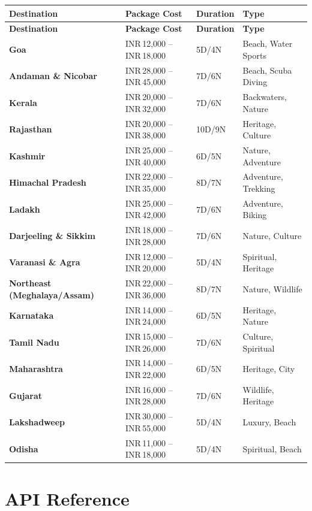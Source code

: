 \documentclass[12pt,a4paper]{article}
\newcommand{\rupee}{INR\,}
\begin{document}
\begin{longtable}{>{\bfseries}p{4.2cm} p{3.5cm} p{1.8cm} p{4cm}}
\toprule
\textbf{Destination} & \textbf{Package Cost} & \textbf{Duration} & \textbf{Type} \\
\midrule
\endfirsthead
\toprule
\textbf{Destination} & \textbf{Package Cost} & \textbf{Duration} & \textbf{Type} \\
\midrule
\endhead
\bottomrule
\endfoot
Goa & \rupee12,000 -- \rupee18,000 & 5D/4N & Beach, Water Sports \\
Andaman \& Nicobar & \rupee28,000 -- \rupee45,000 & 7D/6N & Beach, Scuba Diving \\
Kerala & \rupee20,000 -- \rupee32,000 & 7D/6N & Backwaters, Nature \\
Rajasthan & \rupee20,000 -- \rupee38,000 & 10D/9N & Heritage, Culture \\
Kashmir & \rupee25,000 -- \rupee40,000 & 6D/5N & Nature, Adventure \\
Himachal Pradesh & \rupee22,000 -- \rupee35,000 & 8D/7N & Adventure, Trekking \\
Ladakh & \rupee25,000 -- \rupee42,000 & 7D/6N & Adventure, Biking \\
Darjeeling \& Sikkim & \rupee18,000 -- \rupee28,000 & 7D/6N & Nature, Culture \\
Varanasi \& Agra & \rupee12,000 -- \rupee20,000 & 5D/4N & Spiritual, Heritage \\
Northeast (Meghalaya/Assam) & \rupee22,000 -- \rupee36,000 & 8D/7N & Nature, Wildlife \\
Karnataka & \rupee14,000 -- \rupee24,000 & 6D/5N & Heritage, Nature \\
Tamil Nadu & \rupee15,000 -- \rupee26,000 & 7D/6N & Culture, Spiritual \\
Maharashtra & \rupee14,000 -- \rupee22,000 & 6D/5N & Heritage, City \\
Gujarat & \rupee16,000 -- \rupee28,000 & 7D/6N & Wildlife, Heritage \\
Lakshadweep & \rupee30,000 -- \rupee55,000 & 5D/4N & Luxury, Beach \\
Odisha & \rupee11,000 -- \rupee18,000 & 5D/4N & Spiritual, Beach \\
\end{longtable}

\section{API Reference}
\end{document}
